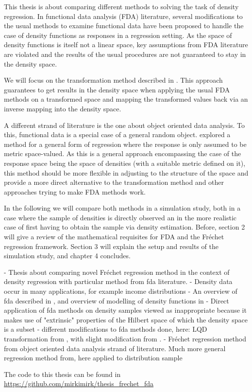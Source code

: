 This thesis is about comparing different methods to solving the task of density
regression. In functional data analysis (FDA) literature, several modifications to
the usual methods to examine functional data have been proposed to handle the case of
density functions as responses in a regression setting. As the space of density functions is itself
not a linear space, key assumptions from FDA literature are violated and the results
of the usual procedures are not guaranteed to stay in the density space.

We will focus on the transformation method described in \textcite{PetersenMüller2016}.
This approach guarantees to get results in the density space when applying the usual
FDA methods on a transformed space and mapping the transformed values back via an
inverse mapping into the density space.

A different strand of literature is the one about object oriented data analysis. To this,
functional data is a special case of a general random object. \textcite{PetersenMüller2019}
explored a method for a general form of regression where the response is only assumed to
be metric space-valued. As this is a general approach encompassing the case of the
response space being the space of densities (with a suitable metric defined on it),
this method should be more flexible in adjusting to the structure of the space and
provide a more direct alternative to the transformation method and other approaches
trying to make FDA methods work.

In the following we will compare both methods in a simulation study, both in a case
where the sample of densities is directly observed an in the more realistic case of
first having to obtain the sample via density estimation. Before, section 2 will give
a review of the mathematical requisites for FDA and the Fréchet regression framework.
Section 3 will explain the setup and results of the simulation study, and chapter 4
concludes.

- Thesis about comparing novel Fréchet regression method in the context of density regression
with particular method from fda literature.
- Density data occur in many applications, for example income distributions \parencite{HildenbrandKneipUtikal1999}
- An overview of fda described in \textcite{WangChiouMüller2016}, and overview of modelling
of density functions in \textcite{PetersenZhangKokoszka2022}
- Direct application of fda methods on density samples viewed as inappropriate because
it makes use of "extrinsic" properties of the Hilbert space of which the density space is
a subset
- different modifications to fda methods done, here: LQD transformation from \textcite{PetersenMüller2016},
with slight modification from \textcite{KokoszkaEtAl2019}.
- Fréchet regression method \textcite{PetersenMüller2019} from object oriented data analysis strand of literature.
Much more general regression method from, here applied to distribution sample


\citet{HorvathKokoszka2012}
\citet{HallHorowitz2007}
\citet{PetersenMüller2019}
\citet{VanDerVaartWellner1996}
\citet{Bosq2000}
\citet{HastiTibshiraniFriedman2009}
\citet{Boor2001}

The code to this thesis can be found in \url{https://github.com/mirkimirk/thesis_frechet_fda}
